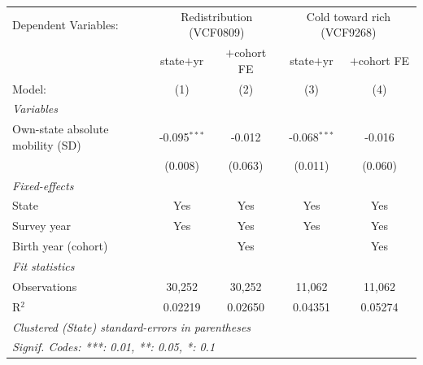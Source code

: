    \begin{tabular}{lcccc}
      \tabularnewline \midrule \midrule
      Dependent Variables: & \multicolumn{2}{c}{Redistribution (VCF0809)} & \multicolumn{2}{c}{Cold toward rich (VCF9268)}\\
                                       & state$+$yr     & $+$cohort FE & state$+$yr     & $+$cohort FE \\   
      Model:                           & (1)            & (2)          & (3)            & (4)\\  
      \midrule
      \emph{Variables}\\
      Own-state absolute mobility (SD) & -0.095$^{***}$ & -0.012       & -0.068$^{***}$ & -0.016\\   
                                       & (0.008)        & (0.063)      & (0.011)        & (0.060)\\   
      \midrule
      \emph{Fixed-effects}\\
      State                            & Yes            & Yes          & Yes            & Yes\\  
      Survey year                      & Yes            & Yes          & Yes            & Yes\\  
      Birth year (cohort)              &                & Yes          &                & Yes\\  
      \midrule
      \emph{Fit statistics}\\
      Observations                     & 30,252         & 30,252       & 11,062         & 11,062\\  
      R$^2$                            & 0.02219        & 0.02650      & 0.04351        & 0.05274\\  
      \midrule \midrule
      \multicolumn{5}{l}{\emph{Clustered (State) standard-errors in parentheses}}\\
      \multicolumn{5}{l}{\emph{Signif. Codes: ***: 0.01, **: 0.05, *: 0.1}}\\
   \end{tabular}
\vspace{3pt}\par{}
